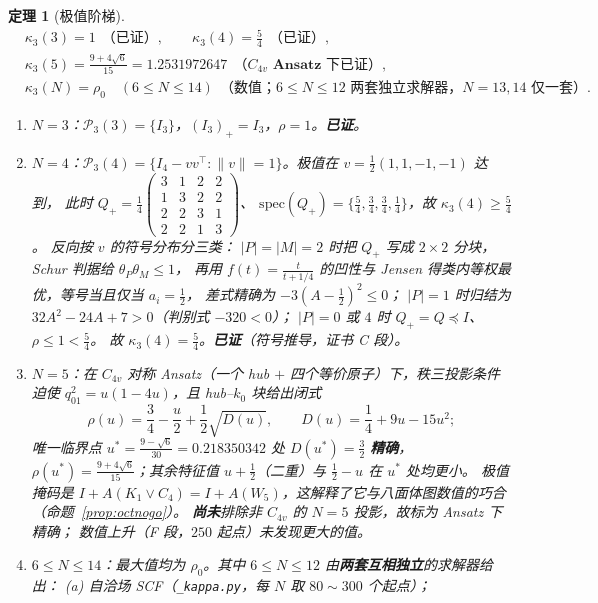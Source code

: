 \documentclass[UTF8,11pt]{ctexart}
\newtheorem{theorem}{定理}[section]
\theoremstyle{definition}
\begin{document}
\begin{theorem}[极值阶梯]\label{thm:ladder}
\[
\begin{aligned}
&\kappa_3(3)=1 \ \ \textbf{（已证）},\qquad
 \kappa_3(4)=\frac54 \ \ \textbf{（已证）},\\[2pt]
&\kappa_3(5)=\frac{9+4\sqrt6}{15}=1.2531972647\ \ \textbf{（$C_{4v}$ Ansatz 下已证）},\\[2pt]
&\kappa_3(N)=\rho_0\quad(6\le N\le14)\ \ \textbf{（数值；}6\le N\le12\textbf{ 两套独立求解器，}
 N=13,14\textbf{ 仅一套）}.
\end{aligned}
\]
\begin{enumerate}[label=(\roman*),leftmargin=2em]
\item $N=3$：$\mathcal P_3(3)=\{I_3\}$，$(I_3)_+=I_3$，$\rho=1$。\textbf{已证}。
\item $N=4$：$\mathcal P_3(4)=\{I_4-vv^\top:\|v\|=1\}$。极值在 $v=\frac12(1,1,-1,-1)$ 达到，
此时
$Q_+=\frac14\left(\begin{smallmatrix}3&1&2&2\\1&3&2&2\\2&2&3&1\\2&2&1&3\end{smallmatrix}\right)$、
$\mathrm{spec}(Q_+)=\{\frac54,\frac34,\frac34,\frac14\}$，故 $\kappa_3(4)\ge\frac54$。
反向按 $v$ 的符号分布分三类：
$|P|=|M|=2$ 时把 $Q_+$ 写成 $2\times2$ 分块，Schur 判据给 $\theta_P\theta_M\le1$，
再用 $f(t)=\frac{t}{t+1/4}$ 的凹性与 Jensen 得类内等权最优，等号当且仅当 $a_i=\frac12$，
差式精确为 $-3(A-\frac12)^2\le0$；
$|P|=1$ 时归结为 $32A^2-24A+7>0$（判别式 $-320<0$）；
$|P|=0$ 或 $4$ 时 $Q_+=Q\preceq I$、$\rho\le1<\frac54$。
故 $\kappa_3(4)=\frac54$。\textbf{已证}（符号推导，证书 C 段）。
\item $N=5$：在 $C_{4v}$ 对称 Ansatz（一个 hub $+$ 四个等价原子）下，秩三投影条件迫使
$q_{01}^2=u(1-4u)$，且 hub--$k_0$ 块给出闭式
\[
\rho(u)=\frac34-\frac u2+\frac12\sqrt{D(u)},\qquad D(u)=\frac14+9u-15u^2 ;
\]
唯一临界点 $u^\ast=\frac{9-\sqrt6}{30}=0.218350342$ 处 $D(u^\ast)=\frac32$ \textbf{精确}，
$\rho(u^\ast)=\frac{9+4\sqrt6}{15}$；其余特征值 $u+\frac12$（二重）与 $\frac12-u$ 在 $u^\ast$ 处均更小。
极值掩码是 $I+A(K_1\vee C_4)=I+A(W_5)$，这解释了它与八面体图数值的巧合
（命题~\ref{prop:octnogo}）。
\textbf{尚未}排除非 $C_{4v}$ 的 $N=5$ 投影，故标为 \emph{Ansatz 下精确}；
数值上升（F 段，$250$ 起点）未发现更大的值。
\item $6\le N\le14$：最大值均为 $\rho_0$。其中 $6\le N\le12$ 由\textbf{两套互相独立}的求解器给出：
(a) 自洽场 SCF（\texttt{\_kappa.py}，每 $N$ 取 $80\sim300$ 个起点）；

\end{enumerate}
\end{theorem}
\end{document}
